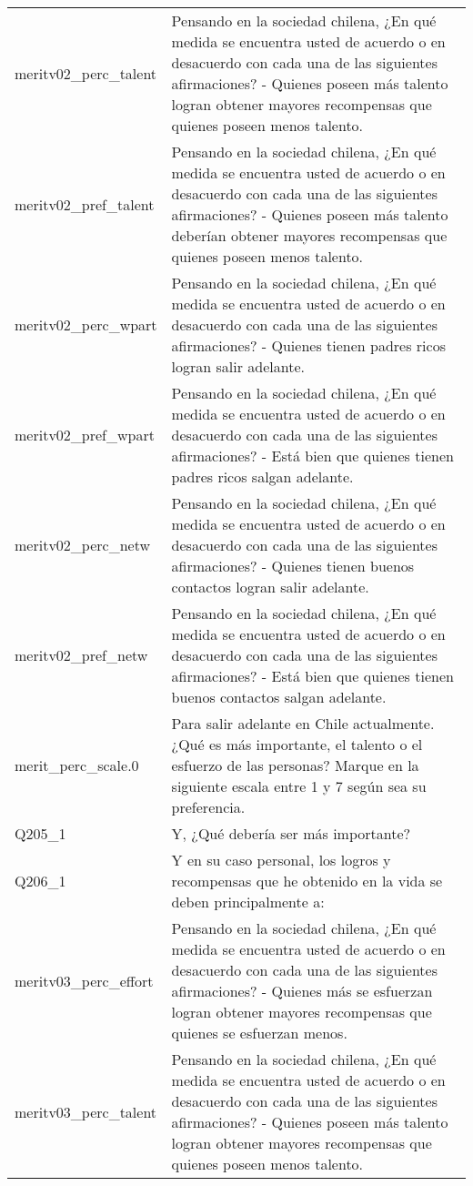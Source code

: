 \documentclass[
  10,
  landscape,
  legalpaper]{article}
\begin{document}
\begin{table}
{\begin{tabular}{l>{\raggedright\arraybackslash}p{10cm}}
\addlinespace
meritv02\_perc\_talent & Pensando en la sociedad chilena, ¿En qué medida se encuentra usted de acuerdo o en desacuerdo con cada una de las siguientes afirmaciones? - Quienes poseen más talento logran obtener mayores recompensas que quienes poseen menos talento.\\
meritv02\_pref\_talent & Pensando en la sociedad chilena, ¿En qué medida se encuentra usted de acuerdo o en desacuerdo con cada una de las siguientes afirmaciones? - Quienes poseen más talento deberían obtener mayores recompensas que quienes poseen menos talento.\\
meritv02\_perc\_wpart & Pensando en la sociedad chilena, ¿En qué medida se encuentra usted de acuerdo o en desacuerdo con cada una de las siguientes afirmaciones? - Quienes tienen padres ricos logran salir adelante.\\
meritv02\_pref\_wpart & Pensando en la sociedad chilena, ¿En qué medida se encuentra usted de acuerdo o en desacuerdo con cada una de las siguientes afirmaciones? - Está bien que quienes tienen padres ricos salgan adelante.\\
meritv02\_perc\_netw & Pensando en la sociedad chilena, ¿En qué medida se encuentra usted de acuerdo o en desacuerdo con cada una de las siguientes afirmaciones? - Quienes tienen buenos contactos logran salir adelante.\\
\addlinespace
meritv02\_pref\_netw & Pensando en la sociedad chilena, ¿En qué medida se encuentra usted de acuerdo o en desacuerdo con cada una de las siguientes afirmaciones? - Está bien que quienes tienen buenos contactos salgan adelante.\\
merit\_perc\_scale.0 & Para salir adelante en Chile actualmente. ¿Qué es más importante, el talento o el esfuerzo de las personas? Marque en la siguiente escala entre 1 y 7 según sea su preferencia.\\
Q205\_1 & Y, ¿Qué debería ser más importante?\\
Q206\_1 & Y en su caso personal, los logros y recompensas que he obtenido en la vida se deben principalmente a:\\
meritv03\_perc\_effort & Pensando en la sociedad chilena, ¿En qué medida se encuentra usted de acuerdo o en desacuerdo con cada una de las siguientes afirmaciones? - Quienes más se esfuerzan logran obtener mayores recompensas que quienes se esfuerzan menos.\\
\addlinespace
meritv03\_perc\_talent & Pensando en la sociedad chilena, ¿En qué medida se encuentra usted de acuerdo o en desacuerdo con cada una de las siguientes afirmaciones? - Quienes poseen más talento logran obtener mayores recompensas que quienes poseen menos talento.\\

\end{tabular}}
\end{table}
\end{document}
